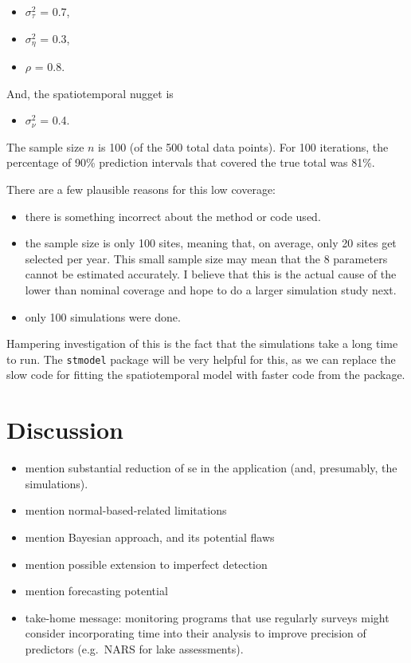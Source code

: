 \documentclass[]{interact}
\theoremstyle{plain}%
\theoremstyle{definition}
\theoremstyle{remark}
\def\tightlist{}
\begin{document}
\begin{itemize}
\tightlist
\item
  \(\sigma^2_{\tau}\) = 0.7,
\item
  \(\sigma^2_{\eta}\) = 0.3,
\item
  \(\rho\) = 0.8.
\end{itemize}

And, the spatiotemporal nugget is

\begin{itemize}
\tightlist
\item
  \(\sigma^2_{\nu}\) = 0.4.
\end{itemize}

The sample size \(n\) is 100 (of the 500 total data points). For 100
iterations, the percentage of 90\% prediction intervals that covered the
true total was 81\%.

There are a few plausible reasons for this low coverage:

\begin{itemize}
\tightlist
\item
  there is something incorrect about the method or code used.
\item
  the sample size is only 100 sites, meaning that, on average, only 20
  sites get selected per year. This small sample size may mean that the
  8 parameters cannot be estimated accurately. I believe that this is
  the actual cause of the lower than nominal coverage and hope to do a
  larger simulation study next.
\item
  only 100 simulations were done.
\end{itemize}

Hampering investigation of this is the fact that the simulations take a
long time to run. The \texttt{stmodel} package will be very helpful for
this, as we can replace the slow code for fitting the spatiotemporal
model with faster code from the package.

\section{Discussion} \label{section:Discussion}

\begin{itemize}
\item
  mention substantial reduction of se in the application (and,
  presumably, the simulations).
\item
  mention normal-based-related limitations
\item
  mention Bayesian approach, and its potential flaws
\item
  mention possible extension to imperfect detection
\item
  mention forecasting potential
\item
  take-home message: monitoring programs that use regularly surveys
  might consider incorporating time into their analysis to improve
  precision of predictors (e.g.~NARS for lake assessments).
\end{itemize}



\end{document}
